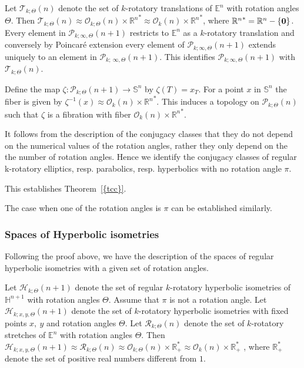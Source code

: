 \documentclass[11pt]{amsart}
\theoremstyle{definition}
\theoremstyle{remark}
\numberwithin{equation}{section}
\theoremstyle{plain}
\begin{document}
Let ${\mathcal T}_{k; \Theta}(n)$ denote the set of $k$-rotatory translations of ${\mathbb E}^n$ with rotation angles $\Theta$. Then ${\mathcal T}_{k; \Theta}(n) \approx {\mathcal O}_{k;  \Theta}(n) \times {{\mathbb R}^n}^{\ast} \approx {\mathcal O}_{k}(n) \times {{\mathbb R}^n}^{\ast}$, where ${{\mathbb R}^n}^{\ast}={\mathbb R}^n-\{{\bf 0}\} $.   Every element in ${\mathcal P}_{k; \infty,\Theta}(n+1)$ restricts to ${\mathbb E}^n$ as a $k$-rotatory translation and conversely by Poincar\'e extension every element of ${\mathcal P}_{k;  \infty,\Theta}(n+1)$ extends uniquely to an element in ${\mathcal P}_{k; \  \infty,\Theta}(n+1)$. This  identifies ${\mathcal P}_{k;  \infty,\Theta}(n+1)$ with ${\mathcal T}_{k; \Theta}(n)$. 

Define the map $\zeta: {\mathcal P}_{k;  \Theta}(n+1) \to {\mathbb S}^n$  by $\zeta(T)=x_T$. For a point $x$ in ${\mathbb S}^n$ the fiber is given by $\zeta^{-1} (x) \approx {\mathcal O}_{k}(n) \times {{\mathbb R}^n}^{\ast}$. This induces a topology on ${\mathcal P}_{k; \Theta}(n)$ such that $\zeta$ is a fibration with fiber ${\mathcal O}_{k}(n) \times {{\mathbb R}^n}^{\ast}$. 

\medskip It follows from the description of the conjugacy classes that they do not depend on the numerical values of the rotation angles, rather they only depend on the the number of rotation angles. Hence we identify
the conjugacy classes of regular k-rotatory elliptics, resp. parabolics, resp. hyperbolics with no rotation angle  $\pi$. 

This establishes {Theorem~\ref{{tcc}}}.

The case when one of the rotation angles is $\pi$ can be established similarly. 

 
\subsubsection{Spaces of Hyperbolic isometries} 
Following the proof above, we have the description of the spaces of regular hyperbolic isometries with a given set of rotation angles. 

 Let ${\mathcal H}_{k;\Theta}(n+1)$ denote the set of regular $k$-rotatory hyperbolic isometries of ${\mathbb H}^{n+1}$ with rotation angles $\Theta$. Assume that $\pi$ is not a  rotation angle.  Let ${\mathcal H}_{k;  x, y, \Theta}(n+1)$ denote the set of $k$-rotatory hyperbolic isometries with fixed points $x, \ y$ and rotation angles $\Theta$.  
    Let ${\mathcal R}_{k; \Theta}(n)$ denote the set of $k$-rotatory stretches of ${\mathbb E}^n$ with rotation angles $\Theta$. Then ${\mathcal H}_{k; x,y,\Theta}(n+1) \approx {\mathcal R}_{k; \Theta}(n) \approx {\mathcal O}_{k; \Theta}(n) \times {\mathbb R}_+^{\ast} \approx {\mathcal O}_{k}(n)\times {\mathbb R}_+^{\ast}$ , where ${\mathbb R}^{\ast}_+$ denote the set of positive real numbers different from $1$. 
\end{document}
